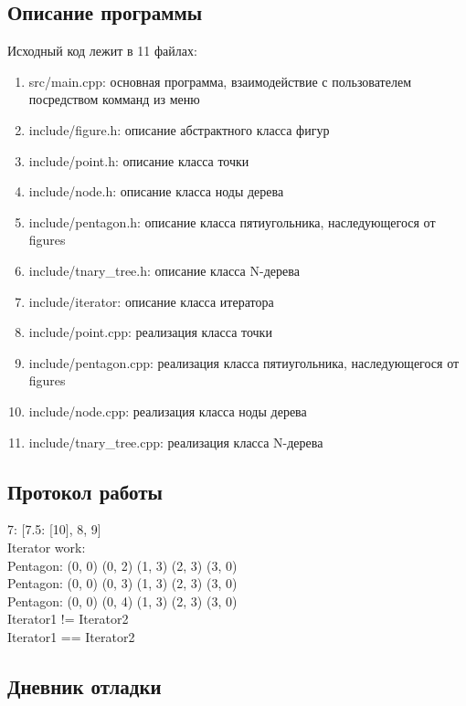 \documentclass[12pt]{article}
\begin{document}
\subsection*{Описание программы}

Исходный код лежит в 11 файлах:
\begin{enumerate}
\item src/main.cpp: основная программа, взаимодействие с пользователем посредством комманд из меню

\item include/figure.h:    описание абстрактного класса фигур

\item include/point.h:     описание класса точки
\item include/node.h:  описание класса ноды дерева
\item include/pentagon.h: описание класса пятиугольника, наследующегося от figures
\item include/tnary\_tree.h:    описание класса N-дерева
\item include/iterator:    описание класса итератора

\item include/point.cpp:     реализация класса точки
\item include/pentagon.cpp:  реализация класса пятиугольника, наследующегося от figures
\item include/node.cpp: реализация класса ноды дерева
\item include/tnary\_tree.cpp:    реализация класса N-дерева

\end{enumerate}

\subsection*{Протокол работы}
7: [7.5: [10], 8, 9] \\
Iterator work: \\
Pentagon: (0, 0)  (0, 2)  (1, 3)  (2, 3)  (3, 0) \\
Pentagon: (0, 0)  (0, 3)  (1, 3)  (2, 3)  (3, 0) \\
Pentagon: (0, 0)  (0, 4)  (1, 3)  (2, 3)  (3, 0) \\
Iterator1 != Iterator2 \\
Iterator1 == Iterator2 \\


\subsection*{Дневник отладки}
\end{document}
